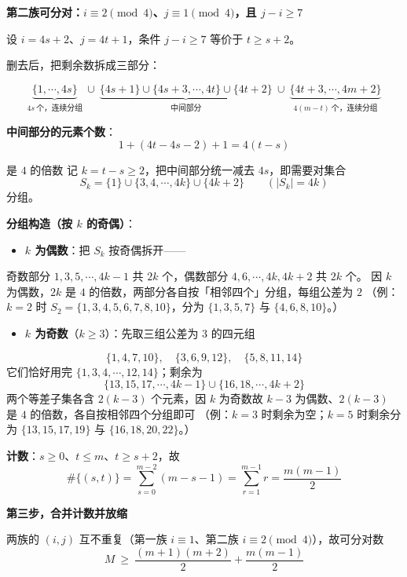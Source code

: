 \par\medskip

\textbf{第二族可分对：$i\equiv2\pmod4$、$j\equiv1\pmod4$，且 $j-i\ge7$}

设 $i=4s+2$、$j=4t+1$，条件 $j-i\ge7$ 等价于 $t\ge s+2$。

删去后，把剩余数拆成三部分：

\[\underbrace{\{1,\cdots,4s\}}_{4s\ \text{个，连续分组}}\ \cup\ \underbrace{\{4s+1\}\cup\{4s+3,\cdots,4t\}\cup\{4t+2\}}_{\text{中间部分}}\ \cup\ \underbrace{\{4t+3,\cdots,4m+2\}}_{4(m-t)\ \text{个，连续分组}}\]

\textbf{中间部分的元素个数}：
\[1+\left(4t-4s-2\right)+1=4(t-s)\]

是 $4$ 的倍数  记 $k=t-s\ge2$，把中间部分统一减去 $4s$，即需要对集合
\[S_k=\{1\}\cup\{3,4,\cdots,4k\}\cup\{4k+2\}\qquad\left(\left|S_k\right|=4k\right)\]
分组。

\textbf{分组构造（按 $k$ 的奇偶）}：

\begin{itemize}
\item \textbf{$k$ 为偶数}：把 $S_k$ 按奇偶拆开——
\end{itemize}
  奇数部分 $1,3,5,\cdots,4k-1$ 共 $2k$ 个，偶数部分 $4,6,\cdots,4k,4k+2$ 共 $2k$ 个。
  因 $k$ 为偶数，$2k$ 是 $4$ 的倍数，两部分各自按「相邻四个」分组，每组公差为 $2$ 
  （例：$k=2$ 时 $S_2=\{1,3,4,5,6,7,8,10\}$，分为 $\{1,3,5,7\}$ 与 $\{4,6,8,10\}$。）

\begin{itemize}
\item \textbf{$k$ 为奇数}（$k\ge3$）：先取三组公差为 $3$ 的四元组
\end{itemize}
\[\{1,4,7,10\},\quad\{3,6,9,12\},\quad\{5,8,11,14\}\]
  它们恰好用完 $\{1,3,4,\cdots,12,14\}$；剩余为
\[\{13,15,17,\cdots,4k-1\}\cup\{16,18,\cdots,4k+2\}\]
  两个等差子集各含 $2(k-3)$ 个元素，因 $k$ 为奇数故 $k-3$ 为偶数、$2(k-3)$ 是 $4$ 的倍数，各自按相邻四个分组即可 
  （例：$k=3$ 时剩余为空；$k=5$ 时剩余分为 $\{13,15,17,19\}$ 与 $\{16,18,20,22\}$。）

\textbf{计数}：$s\ge0$、$t\le m$、$t\ge s+2$，故
\[\#\{(s,t)\}=\sum_{s=0}^{m-2}\left(m-s-1\right)=\sum_{r=1}^{m-1}r=\frac{m(m-1)}2\]

\par\medskip

\textbf{第三步，合并计数并放缩}

两族的 $(i,j)$ 互不重复（第一族 $i\equiv1$、第二族 $i\equiv2\pmod4$），故可分对数
\[M\ \ge\ \frac{(m+1)(m+2)}2+\frac{m(m-1)}2\]

